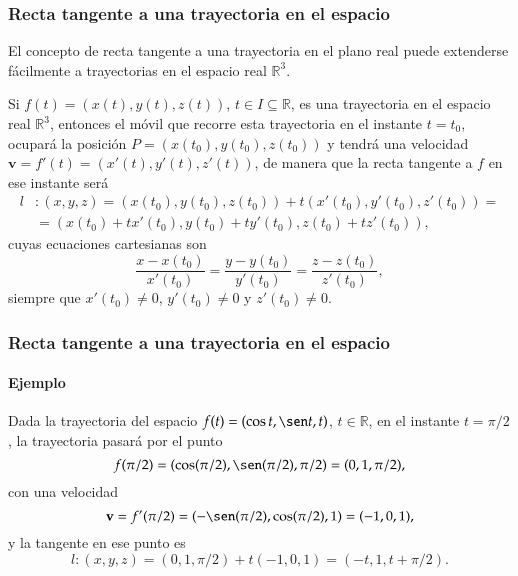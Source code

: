 \begin{frame}
\frametitle{Recta tangente a una trayectoria en el espacio}
El concepto de recta tangente a una trayectoria en el plano real puede extenderse fácilmente a trayectorias en el espacio real $\mathbb{R}^3$.

Si $f(t)=(x(t),y(t),z(t))$, $t\in I\subseteq \mathbb{R}$, es una trayectoria en el espacio real $\mathbb{R}^3$, entonces
el móvil que recorre esta trayectoria en el instante $t=t_0$, ocupará la posición $P=(x(t_0),y(t_0),z(t_0))$ y tendrá una velocidad $\mathbf{v}=f'(t)=(x'(t),y'(t),z'(t))$, de manera que la recta tangente a $f$ en ese instante será
\begin{align*}
l&: (x,y,z)=(x(t_0),y(t_0),z(t_0))+t(x'(t_0),y'(t_0),z'(t_0)) =\\
&= (x(t_0)+tx'(t_0),y(t_0)+ty'(t_0),z(t_0)+tz'(t_0)),
\end{align*}
cuyas ecuaciones cartesianas son 
\[
\frac{x-x(t_0)}{x'(t_0)}=\frac{y-y(t_0)}{y'(t_0)}=\frac{z-z(t_0)}{z'(t_0)},
\]
siempre que $x'(t_0)\neq 0$, $y'(t_0)\neq 0$ y $z'(t_0)\neq 0$.
\end{frame}


\begin{frame}
\frametitle{Recta tangente a una trayectoria en el espacio}
\framesubtitle{Ejemplo}
Dada la trayectoria del espacio $f(t)=(\cos t, \sen t, t)$, $t\in \mathbb{R}$, en el instante $t=\pi/2$, la trayectoria
pasará por el punto
\[
f(\pi/2)=(\cos(\pi/2),\sen(\pi/2),\pi/2)=(0,1,\pi/2),
\] con una velocidad 
\[
\mathbf{v}=f'(\pi/2)=(-\sen(\pi/2),\cos(\pi/2), 1)=(-1,0,1),
\] y la
tangente en ese punto es
\[
l:(x,y,z)=(0,1,\pi/2)+t(-1,0,1) = (-t,1,t+\pi/2).
\] 
\begin{center}
\scalebox{0.8}{}
\end{center} 
\end{frame} 


